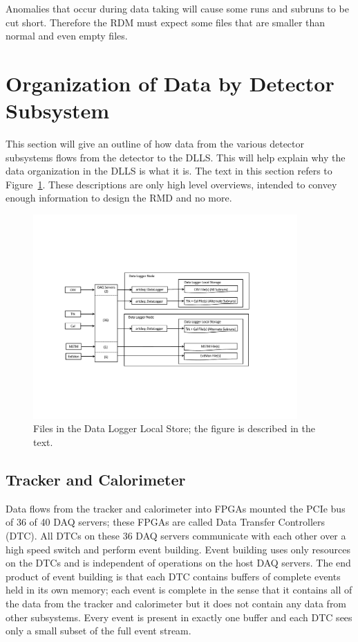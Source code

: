 Anomalies that occur during data taking will cause some runs
and subruns to be cut short.
Therefore the RDM must expect some files that are smaller than normal
and even empty files.


\section{Organization of Data by Detector Subsystem }
\label{ssec:dataOrganization}

This section will give an outline of how data from the
various detector subsystems flows from the detector to the DLLS.
This will help explain why the data organization in the DLLS is what it is.
The text in this section refers to Figure~\ref{fig:filesDLLS}.
These descriptions are only high level overviews,
intended to convey enough information to design the RMD and no more.


\begin{figure}[tbp]
\centering
\includegraphics[width=0.9\textwidth]{figures/FilesInDLLS.pdf}
\caption[Files in the DLLS]{
  Files in the Data Logger Local Store; the figure is described in the text.}
\label{fig:filesDLLS}
\end{figure}


\subsection{Tracker and Calorimeter}
\label{ssec:TrkAndCal}

Data flows from the tracker and calorimeter into FPGAs mounted the PCIe bus of 36 of 40 DAQ servers;
these FPGAs are called Data Transfer Controllers (DTC).
All DTCs on these 36 DAQ servers communicate with each other over a high speed switch
and perform event building.
Event building uses only resources on the DTCs and is independent of operations on the host DAQ servers.
The end product of event building is that each DTC contains buffers of complete events held in its own memory;
each event is complete in the sense that it contains all of the data from the tracker and calorimeter
but it does not contain any data from other subsystems.
Every event is present in exactly one buffer and each DTC sees only a small subset of the full event stream.

